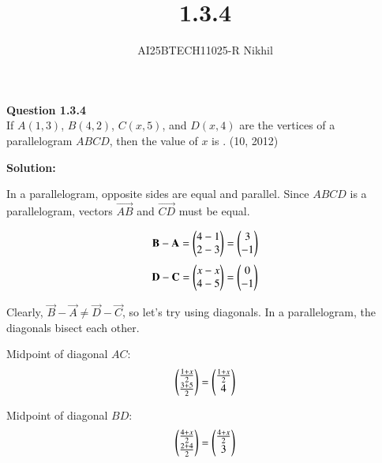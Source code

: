 \documentclass[journal]{IEEEtran}
\begin{document}

\vspace{3cm}

\title{1.3.4}
\author{AI25BTECH11025-R Nikhil}
 \maketitle
{\let\newpage\relax\maketitle}

\renewcommand{\thefigure}{\theenumi}
\renewcommand{\thetable}{\theenumi}
\setlength{\intextsep}{10pt} %


\renewcommand{\thetable}{\theenumi}  
\textbf{Question 1.3.4} \\
If $ A(1, 3) $, $ B(4, 2) $, $ C(x, 5) $, and $ D(x, 4) $ are the vertices of a parallelogram $ABCD$, then the value of $x$ is \underline{\hspace{2cm}}. \hfill (10, 2012)

\vspace{1em}
\textbf{Solution:}

In a parallelogram, opposite sides are equal and parallel. Since $ABCD$ is a parallelogram, vectors $ \vec{AB} $ and $ \vec{CD} $ must be equal.

\begin{align}
\mathbf{B} -\mathbf{A} = \begin{pmatrix}4 - 1\\2 - 3\end{pmatrix} = \begin{pmatrix}3\\ -1\end{pmatrix}
\end{align}
\begin{align}
\mathbf{D} - \mathbf{C} = \begin{pmatrix}x - x\\ 4 - 5\end{pmatrix} = \begin{pmatrix}0\\ -1\end{pmatrix}
\end{align}

Clearly, $ \vec{B}-\vec{A} \neq \vec{D}-\vec{C} $, so let's try using diagonals. In a parallelogram, the diagonals bisect each other.

Midpoint of diagonal $AC$:
\begin{align}
 \begin{pmatrix}\frac{1 + x}{2} \\ \frac{3 + 5}{2} \end{pmatrix} = \begin{pmatrix} \frac{1 + x}{2}\\ 4 \end{pmatrix}
\end{align}

Midpoint of diagonal $BD$:
\begin{align}
\begin{pmatrix}\frac{4 + x}{2} \\ \frac{2 + 4}{2} \end{pmatrix} = \begin{pmatrix} \frac{4 + x}{2}\\ 3 \end{pmatrix}
\end{align}
\end{document}

